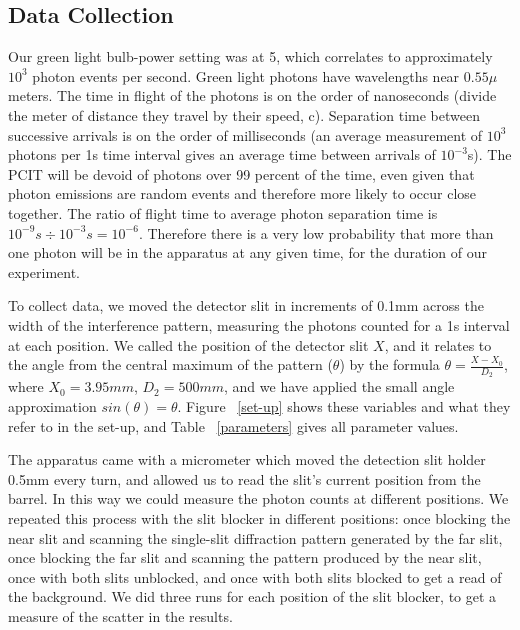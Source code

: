 \documentclass[prb,preprint]{revtex4-1}
\begin{document}
\subsection{Data Collection}

Our green light bulb-power setting was at 5, which correlates to approximately $10^{3}$ photon events per second.  Green light photons have wavelengths near $0.55 \mu $ meters. The time in flight of the photons is on the order of nanoseconds (divide the meter of distance they travel by their speed, c).  Separation time between successive arrivals is on the order of milliseconds (an average measurement of $10^3$ photons per 1s time interval gives an average time between arrivals of $10^{-3}$s).  The PCIT will be devoid of photons over 99 percent of the time, even given that photon emissions are random events and therefore more likely to occur close together.  The ratio of flight time to average photon separation time is $10^{-9}s \div 10^{-3}s = 10^{-6}$. Therefore there is a very low probability that more than one photon will be in the apparatus at any given time, for the duration of our experiment.

To collect data, we moved the detector slit in increments of 0.1mm across the width of the interference pattern, measuring the photons counted for a 1s interval at each position.  We called the position of the detector slit $X$, and it relates to the angle from the central maximum of the pattern ($\theta$) by the formula $\theta = \frac{X-X_0}{D_2}$, where $X_0 = 3.95mm$, $D_2 = 500mm$, and we have applied the small angle approximation $sin(\theta) = \theta$. Figure ~\ref{set-up} shows these variables and what they refer to in the set-up, and Table ~\ref{parameters} gives all parameter values. 

The apparatus came with a micrometer which moved the detection slit holder 0.5mm every turn, and allowed us to read the slit's current position from the barrel.  In this way we could measure the photon counts at different positions.  We repeated this process with the slit blocker in different positions: once blocking the near slit and scanning the single-slit diffraction pattern generated by the far slit, once blocking the far slit and scanning the pattern produced by the near slit, once with both slits unblocked, and once with both slits blocked to get a read of the background.  We did three runs for each position of the slit blocker, to get a measure of the scatter in the results.  
\end{document}
